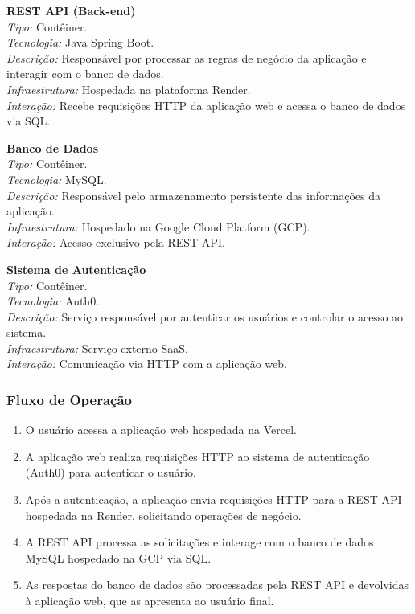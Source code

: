 \documentclass[
	article,			%
	12pt,				%
	oneside,			%
	a4paper,			%
    BIBLATEX,           %
	english,			%
	brazil,				%
	sumario=tradicional
	]{abntex2}
\begin{document}
\textbf{REST API (Back-end)}\\
\textit{Tipo:} Contêiner.\\
\textit{Tecnologia:} Java Spring Boot.\\
\textit{Descrição:} Responsável por processar as regras de negócio da aplicação e interagir com o banco de dados.\\
\textit{Infraestrutura:} Hospedada na plataforma Render.\\
\textit{Interação:} Recebe requisições HTTP da aplicação web e acessa o banco de dados via SQL.

\textbf{Banco de Dados}\\
\textit{Tipo:} Contêiner.\\
\textit{Tecnologia:} MySQL.\\
\textit{Descrição:} Responsável pelo armazenamento persistente das informações da aplicação.\\
\textit{Infraestrutura:} Hospedado na Google Cloud Platform (GCP).\\
\textit{Interação:} Acesso exclusivo pela REST API.

\textbf{Sistema de Autenticação}\\
\textit{Tipo:} Contêiner.\\
\textit{Tecnologia:} Auth0.\\
\textit{Descrição:} Serviço responsável por autenticar os usuários e controlar o acesso ao sistema.\\
\textit{Infraestrutura:} Serviço externo SaaS.\\
\textit{Interação:} Comunicação via HTTP com a aplicação web.

\newpage

\subsubsection{Fluxo de Operação}

\begin{enumerate}
    \item O usuário acessa a aplicação web hospedada na Vercel.
    \item A aplicação web realiza requisições HTTP ao sistema de autenticação (Auth0) para autenticar o usuário.
    \item Após a autenticação, a aplicação envia requisições HTTP para a REST API hospedada na Render, solicitando operações de negócio.
    \item A REST API processa as solicitações e interage com o banco de dados MySQL hospedado na GCP via SQL.
    \item As respostas do banco de dados são processadas pela REST API e devolvidas à aplicação web, que as apresenta ao usuário final.
\end{enumerate}
\end{document}
